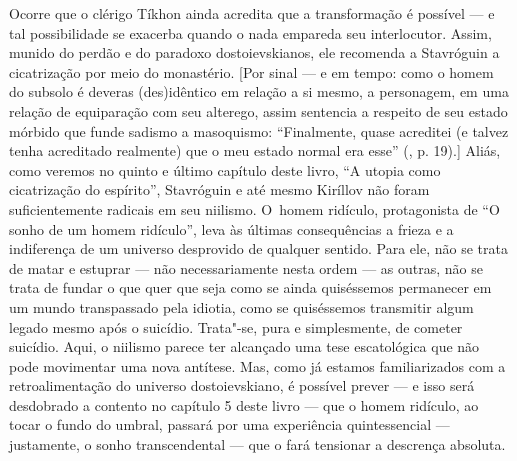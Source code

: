 Ocorre que o clérigo Tíkhon ainda acredita que a transformação é
possível --- e tal possibilidade se exacerba quando o nada empareda seu
interlocutor. Assim, munido do perdão e do paradoxo dostoievskianos, ele
recomenda a Stavróguin a cicatrização por meio do monastério. {[}Por
sinal --- e em tempo: como o homem do subsolo é deveras (des)idêntico em
relação a si mesmo, a personagem, em uma relação de equiparação com seu
alterego, assim sentencia a respeito de seu estado mórbido que funde
sadismo a masoquismo: ``Finalmente, quase acreditei (e talvez tenha
acreditado realmente) que o meu estado normal era esse'' (, p.
19).{]} Aliás, como veremos no quinto e último capítulo deste livro, ``A
utopia como cicatrização do espírito'', Stavróguin e até mesmo Kiríllov
não foram suficientemente radicais em seu niilismo. O~homem ridículo,
protagonista de ``O sonho de um homem ridículo'', leva às últimas
consequências a frieza e a indiferença de um universo desprovido de
qualquer sentido. Para ele, não se trata de matar e estuprar --- não
necessariamente nesta ordem --- as outras, não se trata de fundar o que
quer que seja como se ainda quiséssemos permanecer em um mundo
transpassado pela idiotia, como se quiséssemos transmitir algum legado
mesmo após o suicídio. Trata"-se, pura e simplesmente, de cometer
suicídio. Aqui, o niilismo parece ter alcançado uma tese escatológica
que não pode movimentar uma nova antítese. Mas, como já estamos
familiarizados com a retroalimentação do universo dostoievskiano, é
possível prever --- e isso será desdobrado a contento no capítulo 5 deste
livro --- que o homem ridículo, ao tocar o fundo do umbral, passará por
uma experiência quintessencial --- justamente, o sonho transcendental ---
que o fará tensionar a descrença absoluta.

